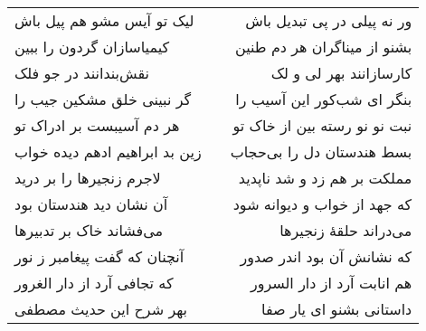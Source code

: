 \begin{center}
\begin{longtable}{l p{0.5cm} r}
لیک تو آیس مشو هم پیل باش
&&
ور نه پیلی در پی تبدیل باش
\\
کیمیاسازان گردون را ببین
&&
بشنو از میناگران هر دم طنین
\\
نقش‌بندانند در جو فلک
&&
کارسازانند بهر لی و لک
\\
گر نبینی خلق مشکین جیب را
&&
بنگر ای شب‌کور این آسیب را
\\
هر دم آسیبست بر ادراک تو
&&
نبت نو نو رسته بین از خاک تو
\\
زین بد ابراهیم ادهم دیده خواب
&&
بسط هندستان دل را بی‌حجاب
\\
لاجرم زنجیرها را بر درید
&&
مملکت بر هم زد و شد ناپدید
\\
آن نشان دید هندستان بود
&&
که جهد از خواب و دیوانه شود
\\
می‌فشاند خاک بر تدبیرها
&&
می‌دراند حلقهٔ زنجیرها
\\
آنچنان که گفت پیغامبر ز نور
&&
که نشانش آن بود اندر صدور
\\
که تجافی آرد از دار الغرور
&&
هم انابت آرد از دار السرور
\\
بهر شرح این حدیث مصطفی
&&
داستانی بشنو ای یار صفا
\\
\end{longtable}
\end{center}

